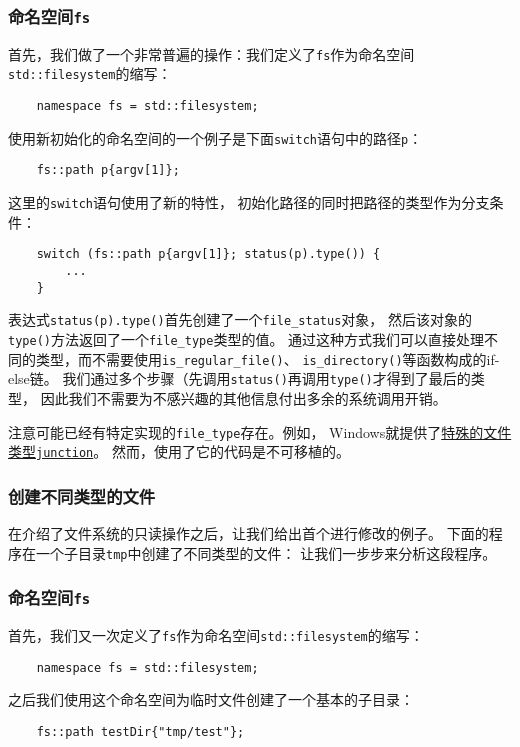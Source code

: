 \subsubsection*{命名空间\texttt{fs}}
首先，我们做了一个非常普遍的操作：我们定义了\texttt{fs}作为命名空间
\texttt{std::filesystem}的缩写：
\begin{lstlisting}
    namespace fs = std::filesystem;
\end{lstlisting}
使用新初始化的命名空间的一个例子是下面\texttt{switch}语句中的路径\texttt{p}：
\begin{lstlisting}
    fs::path p{argv[1]};
\end{lstlisting}
这里的\texttt{switch}语句使用了新的特性，
初始化路径的同时把路径的类型作为分支条件：
\begin{lstlisting}
    switch (fs::path p{argv[1]}; status(p).type()) {
        ...
    }
\end{lstlisting}
表达式\texttt{status(p).type()}首先创建了一个\texttt{file\_status}对象，
然后该对象的\texttt{type()}方法返回了一个\texttt{file\_type}类型的值。
通过这种方式我们可以直接处理不同的类型，而不需要使用\texttt{is\_regular\_file()}、
\texttt{is\_directory()}等函数构成的if-else链。
我们通过多个步骤（先调用\texttt{status()}再调用\texttt{type()}才得到了最后的类型，
因此我们不需要为不感兴趣的其他信息付出多余的系统调用开销。

注意可能已经有特定实现的\texttt{file\_type}存在。例如，
Windows就提供了\hyperref[junction]{特殊的文件类型\texttt{junction}}。
然而，使用了它的代码是不可移植的。

\subsubsection{创建不同类型的文件}
在介绍了文件系统的只读操作之后，让我们给出首个进行修改的例子。
下面的程序在一个子目录\texttt{tmp}中创建了不同类型的文件：
让我们一步步来分析这段程序。

\subsubsection*{命名空间\texttt{fs}}
首先，我们又一次定义了\texttt{fs}作为命名空间\texttt{std::filesystem}的缩写：
\begin{lstlisting}
    namespace fs = std::filesystem;
\end{lstlisting}
之后我们使用这个命名空间为临时文件创建了一个基本的子目录：
\begin{lstlisting}
    fs::path testDir{"tmp/test"};
\end{lstlisting}

